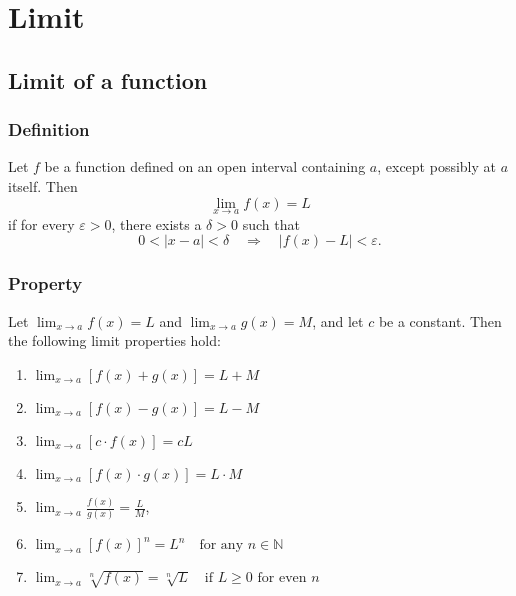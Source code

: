 \documentclass[11pt]{article}
\begin{document}
\pagestyle{plain}
\begin{center}
  \tableofcontents
\end{center}

\newpage
\setcounter{page}{1}
\pagestyle{fancy}

\section{Limit}
\subsection{Limit of a function}
\subsubsection{Definition}
Let $f$ be a function defined on an open interval containing $a$, except possibly at $a$ itself. 
Then \[\lim_{x\to a}f(x) = L\] if for every $\varepsilon > 0$, there exists a $\delta > 0$ such that
\[
0 < |x - a| < \delta \quad \Rightarrow \quad |f(x) - L| < \varepsilon.
\]
\subsubsection{Property}
Let $\displaystyle\lim_{x \to a} f(x) = L$ and $\displaystyle\lim_{x \to a} g(x) = M$, and let $c$ be a constant. Then the following limit properties hold:
\begin{enumerate}
    \item $ 
        \displaystyle
        \lim_{x \to a} [f(x) + g(x)] = L + M
    $    
    \item $
        \displaystyle
        \lim_{x \to a} [f(x) - g(x)] = L - M
    $
    
    \item $
        \displaystyle
        \lim_{x \to a} [c \cdot f(x)] = cL
    $
    
    \item $
        \displaystyle
        \lim_{x \to a} [f(x) \cdot g(x)] = L \cdot M
    $
    
    \item $
        \displaystyle
        \lim_{x \to a} \frac{f(x)}{g(x)} = \frac{L}{M}
    $, 
    
    \item $
        \displaystyle
        \lim_{x \to a} [f(x)]^n = L^n \quad \text{for any } n \in \mathbb{N}
    $
    
    \item $
        \displaystyle
        \lim_{x \to a} \sqrt[n]{f(x)} = \sqrt[n]{L} \quad \text{if } L \ge 0 \text{ for even } n
    $
\end{enumerate}
\end{document}
